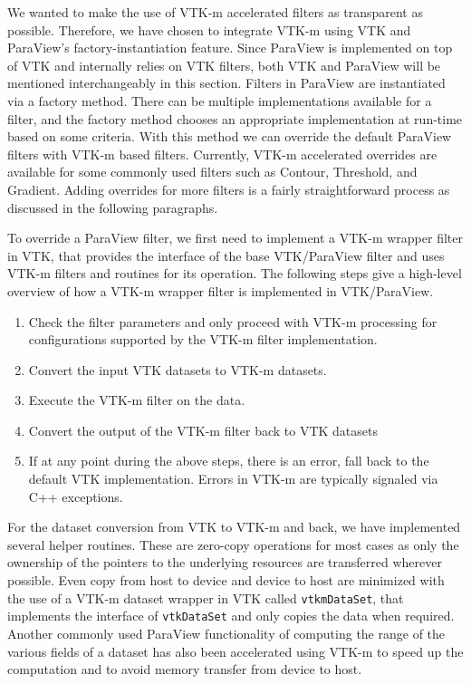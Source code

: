 We wanted to make the use of VTK-m accelerated filters as transparent as possible. Therefore, we have chosen to integrate VTK-m using VTK and ParaView's factory-instantiation feature. Since ParaView is implemented on top of VTK and internally relies on VTK filters, both VTK and ParaView will be mentioned interchangeably in this section. Filters in ParaView are instantiated via a factory method. There can be multiple implementations available for a filter, and the factory method chooses an appropriate implementation at run-time based on some criteria. With this method we can override the default ParaView filters with VTK-m based filters. Currently, VTK-m accelerated overrides are available for some commonly used filters such as Contour, Threshold, and Gradient. Adding overrides for more filters is a fairly straightforward process as discussed in the following paragraphs.

To override a ParaView filter, we first need to implement a VTK-m wrapper filter in VTK, that provides the interface of the base VTK/ParaView filter and uses VTK-m filters and routines for its operation. The following steps give a high-level overview of how a VTK-m wrapper filter is implemented in VTK/ParaView.
\begin{enumerate}
    \item Check the filter parameters and only proceed with VTK-m processing for configurations supported by the VTK-m filter implementation.
    \item Convert the input VTK datasets to VTK-m datasets. 
    \item Execute the VTK-m filter on the data.
    \item Convert the output of the VTK-m filter back to VTK datasets
    \item If at any point during the above steps, there is an error, fall back to the default VTK implementation. Errors in VTK-m are typically signaled via C++ exceptions.
\end{enumerate}

For the dataset conversion from VTK to VTK-m and back, we have implemented several helper routines. These are zero-copy operations for most cases as only the ownership of the pointers to the underlying resources are transferred wherever possible. Even copy from host to device and device to host are minimized with the use of a VTK-m dataset wrapper in VTK called \texttt{vtkmDataSet}, that implements the interface of \texttt{vtkDataSet} and only copies the data when required. Another commonly used ParaView functionality of computing the range of the various fields of a dataset has also been accelerated using VTK-m to speed up the computation and to avoid memory transfer from device to host.

